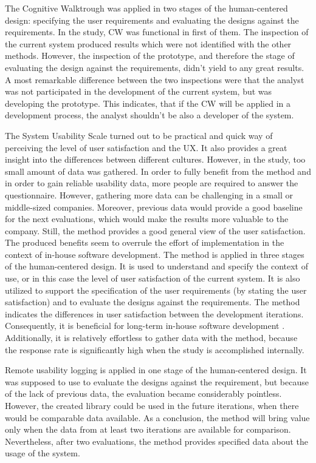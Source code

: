 \documentclass[12pt,a4paper,oneside,pdftex]{report}
\begin{document}
The Cognitive Walktrough was applied in two stages of the human-centered design: specifying the user requirements and evaluating the designs against the requirements. In the study, CW was functional in first of them. The inspection of the current system produced results which were not identified with the other methods. However, the inspection of the prototype, and therefore the stage of evaluating the design against the requirements, didn't yield to any great results. A most remarkable difference between the two inspections were that the analyst was not participated in the development of the current system, but was developing the prototype. This indicates, that if the CW will be applied in a development process, the analyst shouldn't be also a developer of the system.  

The System Usability Scale turned out to be practical and quick way of perceiving the level of user satisfaction and the UX. It also provides a great insight into the differences between different cultures. However, in the study, too small amount of data was gathered. In order to fully benefit from the method and in order to gain reliable usability data, more people are required to answer the questionnaire. However, gathering more data can be challenging in a small or middle-sized companies. Moreover, previous data would provide a good baseline for the next evaluations, which would make the results more valuable to the company. Still, the method provides a good general view of the user satisfaction. The produced benefits seem to overrule the effort of implementation in the context of in-house software development. The method is applied in three stages of the human-centered design. It is used to understand and specify the context of use, or in this case the level of user satisfaction of the current system. It is also utilized to support the specification of the user requirements (by stating the user satisfaction) and to evaluate the designs against the requirements. The method indicates the differences in user satisfaction between the development iterations. Consequently, it is beneficial for long-term in-house software development . Additionally, it is relatively effortless to gather data with the method, because the response rate is significantly high when the study is accomplished internally.

Remote usability logging is applied in one stage of the human-centered design. It was supposed to use to evaluate the designs against the requirement, but because of the lack of previous data, the evaluation became considerably pointless. However, the created library could be used in the future iterations, when there would be comparable data available. As a conclusion, the method will bring value only when the data from at least two iterations are available for comparison. Nevertheless, after two evaluations, the method provides specified data about the usage of the system.
      
\end{document}
